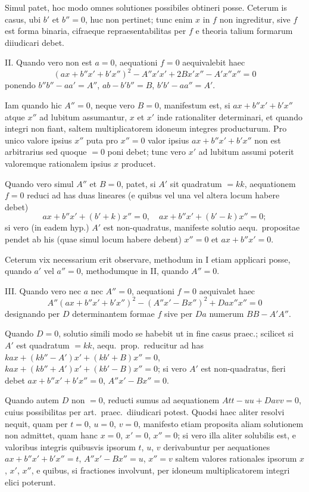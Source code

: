 \documentclass[12pt,a4paper]{article}
\theoremstyle{plain}
\theoremstyle{definition}
\theoremstyle{remark}
\begin{document}
Simul patet, hoc modo omnes solutiones possibiles obtineri posse. Ceterum is casus, ubi $b'$ et $b'' = 0$, huc non pertinet; tunc enim $x$ in $f$ non ingreditur, sive $f$ est forma binaria, cifraeque repraesentabilitas per $f$ e theoria talium formarum diiudicari debet.

\textsc{II.} Quando vero non est $a = 0$, aequationi $f = 0$ aequivalebit haec
\[
(ax + b''x' + b'x'')^2 - A''x'x' + 2Bx'x'' - A'x''x'' = 0
\]
ponendo $b''b'' - aa' = A''$, $ab - b'b'' = B$, $b'b' - aa'' = A'$.

Iam quando hic $A'' = 0$, neque vero $B = 0$, manifestum est, si $ax + b''x' + b'x''$ atque $x''$ ad lubitum assumantur, $x$ et $x'$ inde rationaliter determinari, et quando integri non fiant, saltem multiplicatorem idoneum integres producturum. Pro unico valore ipsius $x''$ puta pro $x'' = 0$ valor ipsius $ax + b''x' + b'x''$ non est arbitrarius sed quoque $= 0$ poni debet; tunc vero $x'$ ad lubitum assumi poterit valoremque rationalem ipsius $x$ producet.

Quando vero simul $A''$ et $B = 0$, patet, si $A'$ sit quadratum $= kk$, aequationem $f = 0$ reduci ad has duas lineares (e quibus vel una vel altera locum habere debet)
\[
ax + b''x' + (b'+k)x'' = 0,\quad ax + b''x' + (b'-k)x'' = 0;
\]
si vero (in eadem hyp.) $A'$ est non-quadratus, manifeste solutio aequ.~propositae pendet ab his (quae simul locum habere debent) $x'' = 0$ et $ax + b''x' = 0$.

Ceterum vix necessarium erit observare, methodum in I etiam applicari posse, quando $a'$ vel $a'' = 0$, methodumque in II, quando $A'' = 0$.

\textsc{III.} Quando vero nec $a$ nec $A'' = 0$, aequationi $f = 0$ aequivalet haec
\[
A''(ax + b''x' + b'x'')^2 - (A''x' - Bx'')^2 + Da x''x'' = 0
\]
designando per $D$ determinantem formae $f$ sive per $Da$ numerum $BB - A'A''$.

Quando $D = 0$, solutio simili modo se habebit ut in fine casus praec.; scilicet si $A'$ est quadratum $= kk$, aequ.~prop.~reducitur ad has $kax + (kb'' - A')x' + (kb' + B)x'' = 0$, $kax + (kb'' + A')x' + (kb' - B)x'' = 0$; si vero $A'$ est non-quadratus, fieri debet $ax + b''x' + b'x'' = 0$, $A''x' - Bx'' = 0$.

Quando autem $D$ non $= 0$, reducti sumus ad aequationem $Att - uu + Davv = 0$, cuius possibilitas per art.~praec.~diiudicari potest. Quodsi haec aliter resolvi nequit, quam per $t = 0$, $u = 0$, $v = 0$, manifesto etiam proposita aliam solutionem non admittet, quam hanc $x = 0$, $x' = 0$, $x'' = 0$; si vero illa aliter solubilis est, e valoribus integris quibusvis ipsorum $t$, $u$, $v$ derivabuntur per aequationes $ax + b''x' + b'x'' = t$, $A''x' - Bx'' = u$, $x'' = v$ saltem valores rationales ipsorum $x$, $x'$, $x''$, e quibus, si fractiones involvunt, per idoneum multiplicatorem integri elici poterunt.
\end{document}
